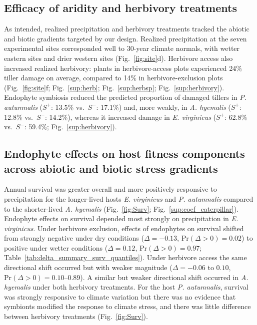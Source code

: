 \documentclass[12pt]{article}\usepackage[]{graphicx}\usepackage[dvipsnames]{xcolor}
\newcommand{\revise}[1]{{\color{Mahogany}{#1}}}
\begin{document}
\subsection*{Efficacy of aridity and herbivory treatments}
As intended, realized precipitation and herbivory treatments tracked the abiotic and biotic gradients targeted by our design. 
Realized precipitation at the seven experimental sites corresponded well to 30-year climate normals, with wetter eastern sites and drier western sites (Fig.~\ref{fig:site}d). 
Herbivore access also increased realized herbivory: plants in herbivore-access plots experienced 24\% tiller damage on average, compared to 14\% in herbivore-exclusion plots (Fig.~\ref{fig:site}f; Fig.~\ref{sup:herb}; Fig.~\ref{sup:herbsp}; Fig.~\ref{sup:herbivory}).
Endophyte symbiosis reduced the predicted proportion of damaged tillers in \textit{P. autumnalis} ($S^+$: 13.5\% vs.\ $S^-$: 17.1\%) and, more weakly, in \textit{A. hyemalis} ($S^+$: 12.8\% vs.\ $S^-$: 14.2\%), whereas it increased damage in \textit{E. virginicus} ($S^+$: 62.8\% vs.\ $S^-$: 59.4\%; Fig.~\ref{sup:herbivory}).

\subsection*{Endophyte effects on host fitness components across abiotic and biotic stress gradients}
Annual survival was greater overall and more positively responsive to precipitation for the longer-lived hosts \textit{E. virginicus} and \textit{P. autumnalis} compared to the shorter-lived \textit{A. hyemalis} (Fig.~\ref{fig:Surv}; Fig.~\ref{sup:coef_caterpillar}).
Endophyte effects on survival depended most strongly on precipitation in \textit{E. virginicus}. 
Under herbivore exclusion, effects of endophytes on survival shifted from strongly negative under dry conditions ($\Delta = -0.13$, $\mathrm{Pr}(\Delta > 0) = 0.02$) to positive under wetter conditions ($\Delta = 0.12$, $\mathrm{Pr}(\Delta > 0) = 0.97$; Table~\ref{tab:delta_summary_surv_quantiles}). 
Under herbivore access the same directional shift occurred but with weaker magnitude ($\Delta = -0.06$ to $0.10$, $\mathrm{Pr}(\Delta > 0) = 0.10$--$0.89$). 
A similar but weaker directional shift occurred in \textit{A. hyemalis} under both herbivory treatments.
For the host \textit{P. autumnalis}, survival was strongly responsive to climate variation but there was no evidence that symbionts modified the response to climate stress, and there was little difference between herbivory treatments (Fig.~\ref{fig:Surv}).
\end{document}
